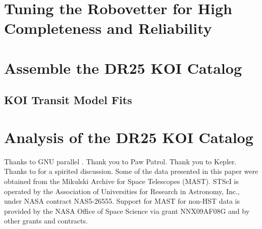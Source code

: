 \documentclass[apj,twocolappendix,numberedappendix]{emulateapj}
\renewcommand{\_}{\discretionary{\underscore}{}{\underscore}}  %
\begin{document}
\section{Tuning the Robovetter for High Completeness and Reliability}



\section{Assemble the DR25 KOI Catalog}


\subsection{KOI Transit Model Fits}


\section{Analysis of the DR25 KOI Catalog}














\acknowledgments
Thanks to GNU parallel \citep{Tange2011a}.
Thank you to Paw Patrol.
Thank you to Kepler.
Thanks to \citet{Turbo-King2017} for a spirited discussion.
Some of the data presented in this paper were obtained from the Mikulski Archive for Space Telescopes (MAST). STScI is operated by the Association of Universities for Research in Astronomy, Inc., under NASA contract NAS5-26555. Support for MAST for non-HST data is provided by the NASA Office of Space Science via grant NNX09AF08G and by other grants and contracts.



%



\clearpage
\appendix





\clearpage
\tableofcontents
\end{document}

